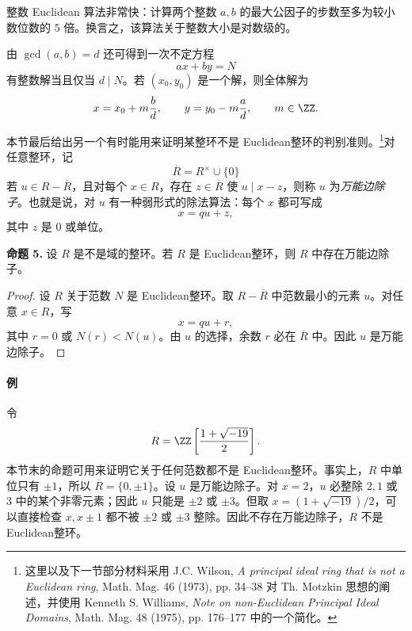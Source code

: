 整数 Euclidean 算法非常快：计算两个整数 $a,b$ 的最大公因子的步数至多为较小数位数的 $5$ 倍。换言之，该算法关于整数大小是对数级的。

由 $\gcd(a,b)=d$ 还可得到一次不定方程
\[
ax+by=N
\]
有整数解当且仅当 $d\mid N$。若 $(x_0,y_0)$ 是一个解，则全体解为
\[
x=x_0+m{b\over d},
\qquad
y=y_0-m{a\over d},
\qquad m\in\ZZ.
\]

本节最后给出另一个有时能用来证明某整环不是 Euclidean整环的判别准则。\footnote{这里以及下一节部分材料采用 J.C. Wilson, \emph{A principal ideal ring that is not a Euclidean ring}, Math. Mag. 46 (1973), pp. 34--38 对 Th. Motzkin 思想的阐述，并使用 Kenneth S. Williams, \emph{Note on non-Euclidean Principal Ideal Domains}, Math. Mag. 48 (1975), pp. 176--177 中的一个简化。}对任意整环，记
\[
\overline R=R^\times\cup\{0\}
\]
若 $u\in R-\overline R$，且对每个 $x\in R$，存在 $z\in\overline R$ 使 $u\mid x-z$，则称 $u$ 为\emph{万能边除子}。也就是说，对 $u$ 有一种弱形式的除法算法：每个 $x$ 都可写成
\[
x=qu+z,
\]
其中 $z$ 是 $0$ 或单位。

\noindent\textbf{命题 5.}
设 $R$ 是不是域的整环。若 $R$ 是 Euclidean整环，则 $R$ 中存在万能边除子。

\begin{proof}
	设 $R$ 关于范数 $N$ 是 Euclidean整环。取 $R-\overline R$ 中范数最小的元素 $u$。对任意 $x\in R$，写
	\[
	x=qu+r,
	\]
	其中 $r=0$ 或 $N(r)<N(u)$。由 $u$ 的选择，余数 $r$ 必在 $\overline R$ 中。因此 $u$ 是万能边除子。
\end{proof}

\paragraph{例}
令
\[
R=\ZZ\left[{1+\sqrt{-19}\over2}\right].
\]
本节末的命题可用来证明它关于任何范数都不是 Euclidean整环。事实上，$R$ 中单位只有 $\pm1$，所以 $\overline R=\{0,\pm1\}$。设 $u$ 是万能边除子。对 $x=2$，$u$ 必整除 $2,1$ 或 $3$ 中的某个非零元素；因此 $u$ 只能是 $\pm2$ 或 $\pm3$。但取 $x=(1+\sqrt{-19})/2$，可以直接检查 $x,x\pm1$ 都不被 $\pm2$ 或 $\pm3$ 整除。因此不存在万能边除子，$R$ 不是 Euclidean整环。

